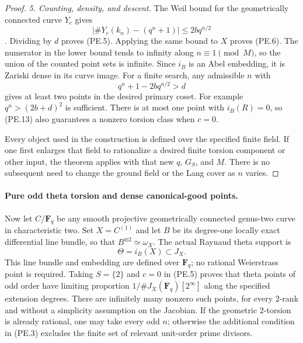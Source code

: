 \documentclass[11pt,a4paper]{article}
\begin{document}
\begin{proof}
\emph{5. Counting, density, and descent.}
The Weil bound for the geometrically connected curve $Y_c$ gives
\[
       \bigl|\#Y_c(k_n)-(q^n+1)\bigr|\le2bq^{n/2}
\]
\cite[Theorem~11.1]{MilneJV}. Dividing by $d$ proves (PE.5).
Applying the same bound to $X$ proves (PE.6).
The numerator in the lower bound tends to infinity along
$n\equiv1\pmod M$, so the union of the counted point sets is
infinite. Since $i_B$ is an Abel embedding, it is Zariski dense
in its curve image. For a finite search, any admissible $n$ with
\[
                  q^n+1-2bq^{n/2}>d
 \tag{PE.13}
\]
gives at least two points in the desired primary coset. For
example $q^n>(2b+d)^2$ is sufficient. There is at most one point
with $i_B(R)=0$, so (PE.13) also guarantees a nonzero torsion
class when $c=0$.

Every object used in the construction is defined over the
specified finite field. If one first enlarges that field to
rationalize a desired finite torsion component or other input,
the theorem applies with that new $q$, $G_S$, and $M$. There is
no subsequent need to change the ground field or the Lang cover
as $n$ varies.
\end{proof}

\paragraph{Pure odd theta torsion and dense canonical-good points.}
Now let $C/\mathbf F_q$ be any smooth projective geometrically
connected genus-two curve in characteristic two. Set
$X=C^{(1)}$ and let $B$ be its degree-one locally exact
differential line bundle, so that $B^{\otimes2}\simeq\omega_X$.
The actual Raynaud theta support is
\[
                   \Theta=i_B(X)\subset J_X.
 \tag{PE.14}
\]
This line bundle and embedding are defined over $\mathbf F_q$;
no rational Weierstrass point is required. Taking $S=\{2\}$ and
$c=0$ in (PE.5) proves that theta points of odd order have
limiting proportion $1/\#J_X(\mathbf F_q)[2^\infty]$ along the
specified extension degrees. There are infinitely many nonzero
such points, for every $2$-rank and without a simplicity
assumption on the Jacobian. If the geometric $2$-torsion is
already rational, one may take every odd $n$; otherwise the
additional condition in (PE.3) excludes the finite set of
relevant unit-order prime divisors.
\end{document}
